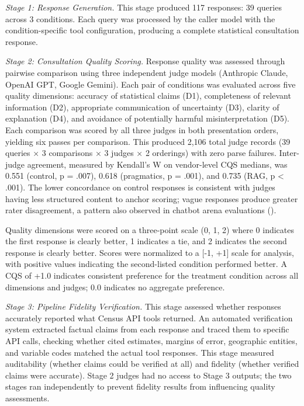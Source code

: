\documentclass[
  11pt,
  letterpaper,
]{article}
\begin{document}
\emph{Stage 1: Response Generation.} This stage produced 117 responses:
39 queries across 3 conditions. Each query was processed by the caller
model with the condition-specific tool configuration, producing a
complete statistical consultation response.

\emph{Stage 2: Consultation Quality Scoring.} Response quality was
assessed through pairwise comparison using three independent judge
models (Anthropic Claude, OpenAI GPT, Google Gemini). Each pair of
conditions was evaluated across five quality dimensions: accuracy of
statistical claims (D1), completeness of relevant information (D2),
appropriate communication of uncertainty (D3), clarity of explanation
(D4), and avoidance of potentially harmful misinterpretation (D5). Each
comparison was scored by all three judges in both presentation orders,
yielding six passes per comparison. This produced 2,106 total judge
records (39 queries × 3 comparisons × 3 judges × 2 orderings) with zero
parse failures. Inter-judge agreement, measured by Kendall's W on
vendor-level CQS medians, was 0.551 (control, p = .007), 0.618
(pragmatics, p = .001), and 0.735 (RAG, p \textless{} .001). The lower
concordance on control responses is consistent with judges having less
structured content to anchor scoring; vague responses produce greater
rater disagreement, a pattern also observed in chatbot arena evaluations
().

Quality dimensions were scored on a three-point scale (0, 1, 2) where 0
indicates the first response is clearly better, 1 indicates a tie, and 2
indicates the second response is clearly better. Scores were normalized
to a {[}-1, +1{]} scale for analysis, with positive values indicating
the second-listed condition performed better. A CQS of +1.0 indicates
consistent preference for the treatment condition across all dimensions
and judges; 0.0 indicates no aggregate preference.

\emph{Stage 3: Pipeline Fidelity Verification.} This stage assessed
whether responses accurately reported what Census API tools returned. An
automated verification system extracted factual claims from each
response and traced them to specific API calls, checking whether cited
estimates, margins of error, geographic entities, and variable codes
matched the actual tool responses. This stage measured auditability
(whether claims could be verified at all) and fidelity (whether verified
claims were accurate). Stage 2 judges had no access to Stage 3 outputs;
the two stages ran independently to prevent fidelity results from
influencing quality assessments.
\end{document}

